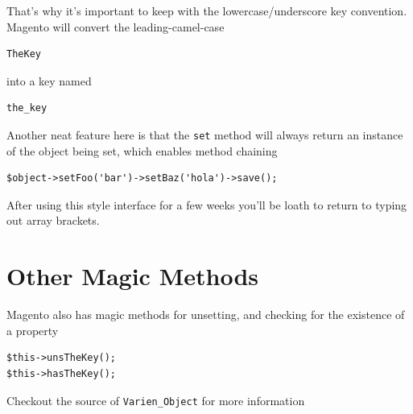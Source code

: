 \documentclass[oneside]{book}
\begin{document}
That's why it's important to keep with the lowercase/underscore key convention.  Magento will convert the leading-camel-case

\begin{lstlisting}
TheKey

\end{lstlisting}


into a key named

\begin{lstlisting}
the_key

\end{lstlisting}


Another neat feature here is that the \footnotesize\texttt{set} \normalsize  method will always return an instance of the object being set, which enables method chaining

\begin{lstlisting}
$object->setFoo('bar')->setBaz('hola')->save();

\end{lstlisting}


After using this style interface for a few weeks you'll be loath to return to typing out array brackets.

\section{Other Magic Methods}

Magento also has magic methods for unsetting, and checking for the existence of a property

\begin{lstlisting}
$this->unsTheKey();
$this->hasTheKey();

\end{lstlisting}


Checkout the source of \footnotesize\texttt{Varien\_Object} \normalsize  for more information
\end{document}
